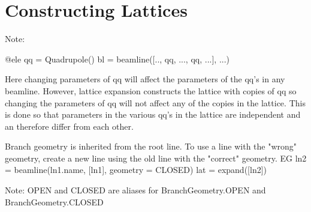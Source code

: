 \chapter{Constructing Lattices}
\label{c:construct-lat}

Note: 
\begin{example}
  @ele qq = Quadrupole()
  bl = beamline([.., qq, ..., qq, ...], ...)
\end{example}
Here changing parameters of qq will affect the parameters of the qq's in any beamline.
However, lattice expansion constructs the lattice with copies of qq so changing the
parameters of qq will not affect any of the copies in the lattice. This is done so that
parameters in the various qq's in the lattice are independent and an therefore differ from each
other. 

Branch geometry is inherited from the root line. To use a line with the "wrong" geometry, create
a new line using the old line with the "correct" geometry. EG
  ln2 = beamline(ln1.name, [ln1], geometry = CLOSED)
  lat = expand([ln2])

Note: OPEN and CLOSED are aliases for BranchGeometry.OPEN and BranchGeometry.CLOSED